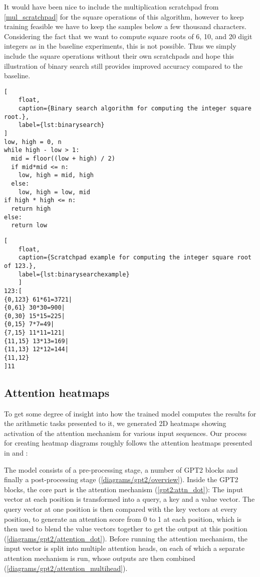 It would have been nice to include the multiplication scratchpad from \cref{mul_scratchpad} for the square operations of this algorithm, however to keep training feasible we have to keep the samples below a few thousand characters. Considering the fact that we want to compute square roots of 6, 10, and 20 digit integers as in the baseline experiments, this is not possible.
Thus we simply include the square operations without their own scratchpads and hope this illustration of binary search still provides improved accuracy compared to the baseline.


\begin{lstlisting}[
	float,
	caption={Binary search algorithm for computing the integer square root.},
	label={lst:binarysearch}
]
low, high = 0, n
while high - low > 1:
  mid = floor((low + high) / 2)
  if mid*mid <= n:
    low, high = mid, high
  else:
    low, high = low, mid 
if high * high <= n:
  return high
else:
  return low
\end{lstlisting}



\begin{lstlisting}[
	float,
	caption={Scratchpad example for computing the integer square root of 123.},
	label={lst:binarysearchexample}
	]
123:[
{0,123} 61*61=3721| 
{0,61} 30*30=900|
{0,30} 15*15=225|
{0,15} 7*7=49|
{7,15} 11*11=121|
{11,15} 13*13=169|
{11,13} 12*12=144|
{11,12}
]11
\end{lstlisting}





\FloatBarrier
\subsection{Attention heatmaps}
\label{methods:heatmap}

To get some degree of insight into how the trained model computes the results for the arithmetic tasks presented to it, we generated 2D heatmaps showing activation of the attention mechanism for various input sequences. Our process for creating heatmap diagrams roughly follows the attention heatmaps presented in \cite{bertsecrets} and \cite{analyzingheads}:

The model consists of a pre-processing stage, a number of GPT2 blocks and finally a post-processing stage (\cref{diagrams/gpt2/overview}). Inside the GPT2 blocks, the core part is the attention mechanism (\cref{gpt2:attn_dot}): The input vector at each position is transformed into a query, a key and a value vector. The query vector at one position is then compared with the key vectors at every position, to generate an attention score from 0 to 1 at each position, which is then used to blend the value vectors together to get the output at this position (\cref{diagrams/gpt2/attention_dot}).
Before running the attention mechanism, the input vector is split into multiple attention heads, on each of which a separate attention mechanism is run, whose outputs are then combined (\cref{diagrams/gpt2/attention_multihead}).

